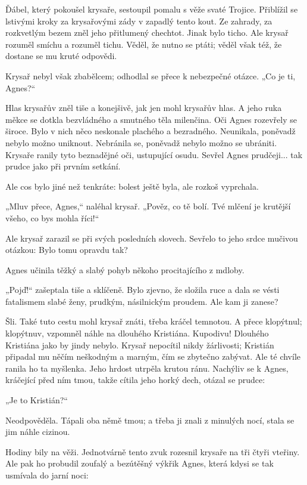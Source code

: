 \documentclass[11pt]{article}
\begin{document}
    Ďábel, který pokoušel krysaře, sestoupil pomalu s věže svaté Trojice. Přiblížil se lstivými kroky za krysařovými zády v zapadlý tento kout. Ze zahrady, za rozkvetlým bezem zněl jeho přitlumený chechtot. Jinak bylo ticho. Ale krysař rozuměl smíchu a rozuměl tichu. Věděl, že nutno se ptáti; věděl však též, že dostane se mu kruté odpovědi.

    Krysař nebyl však zbabělcem; odhodlal se přece k nebezpečné otázce. „Co je ti, Agnes?“

    Hlas krysařův zněl tiše a konejšivě, jak jen mohl krysařův hlas. A jeho ruka měkce se dotkla bezvládného a smutného těla milenčina. Oči Agnes rozevřely se široce. Bylo v nich něco neskonale plachého a bezradného. Neunikala, poněvadž nebylo možno uniknout. Nebránila se, poněvadž nebylo možno se ubrániti. Krysaře ranily tyto beznadějné oči, ustupující osudu. Sevřel Agnes prudčeji... tak prudce jako při prvním setkání.

    Ale cos bylo jiné než tenkráte: bolest ještě byla, ale rozkoš vyprchala.

    „Mluv přece, Agnes,“ naléhal krysař. „Pověz, co tě bolí. Tvé mlčení je krutější všeho, co bys mohla říci!“

    Ale krysař zarazil se při svých posledních slovech. Sevřelo to jeho srdce mučivou otázkou: Bylo tomu opravdu tak?

    Agnes učinila těžký a slabý pohyb někoho procitajícího z mdloby.

    „Pojď!“ zašeptala tiše a sklíčeně. Bylo zjevno, že složila ruce a dala se vésti fatalismem slabé ženy, prudkým, násilnickým proudem. Ale kam ji zanese?

    Šli. Také tuto cestu mohl krysař znáti, třeba kráčel temnotou. A přece klopýtnul; klopýtnuv, vzpomněl náhle na dlouhého Kristiána. Kupodivu! Dlouhého Kristiána jako by jindy nebylo. Krysař nepocítil nikdy žárlivosti; Kristián připadal mu něčím neškodným a marným, čím se zbytečno zabývat. Ale té chvíle ranila ho ta myšlenka. Jeho hrdost utrpěla krutou ránu. Nachýliv se k Agnes, kráčející před ním tmou, takže cítila jeho horký dech, otázal se prudce:

    „Je to Kristián?“

    Neodpověděla. Tápali oba němě tmou; a třeba ji znali z minulých nocí, stala se jim náhle cizinou.

    Hodiny bily na věži. Jednotvárně tento zvuk rozesnil krysaře na tři čtyři vteřiny. Ale pak ho probudil zoufalý a bezútěšný výkřik Agnes, která kdysi se tak usmívala do jarní noci:
\end{document}
